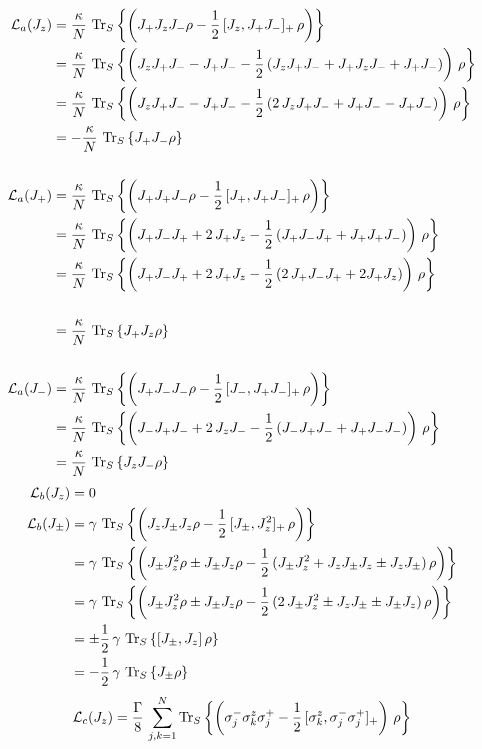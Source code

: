 \documentclass{article}
\begin{document}
\begin{appendices}
\begin{align*}
    \mathcal{L}_a(J_z)&=\frac{\kappa}{N}\,\operatorname{Tr}_S\left\{\left(J_+ J_z J_- \rho-\frac{1}{2}\,[J_z,J_+ J_-]_+\,\rho\right)\right\}\\
    &=\frac{\kappa}{N}\,\operatorname{Tr}_S\left\{\left(J_z J_+ J_- - J_+ J_- -\frac{1}{2}\,(J_z J_+ J_- + J_+ J_z J_- + J_+ J_-)\right)\,\rho\right\}\\
    &=\frac{\kappa}{N}\,\operatorname{Tr}_S\left\{\left(J_z J_+ J_- - J_+ J_- -\frac{1}{2}\,(2\,J_z J_+ J_- + J_+ J_- - J_+ J_-)\right)\,\rho\right\}\\
    &=-\frac{\kappa}{N}\,\operatorname{Tr}_S\left\{J_+ J_- \rho\right\}\\\\
    \mathcal{L}_a(J_+)&=\frac{\kappa}{N}\,\operatorname{Tr}_S\left\{\left(J_+ J_+ J_- \rho-\frac{1}{2}\,[J_+,J_+ J_-]_+\,\rho\right)\right\}\\
    &=\frac{\kappa}{N}\,\operatorname{Tr}_S\left\{\left(J_+ J_- J_+ + 2\,J_+ J_z -\frac{1}{2}\,(J_+ J_- J_+ + J_+ J_+ J_-)\right)\,\rho\right\}\\ &=\frac{\kappa}{N}\,\operatorname{Tr}_S\left\{\left(J_+ J_- J_+ + 2\,J_+ J_z -\frac{1}{2}\,(2\,J_+ J_- J_+ + 2 J_+ J_z)\right)\,\rho\right\}\\\\
    &=\frac{\kappa}{N}\,\operatorname{Tr}_S\left\{J_+ J_z \rho\right\}\\\\
    \mathcal{L}_a(J_-)&=\frac{\kappa}{N}\,\operatorname{Tr}_S\left\{\left(J_+ J_- J_- \rho-\frac{1}{2}\,[J_-,J_+ J_-]_+\,\rho\right)\right\}\\
    &=\frac{\kappa}{N}\,\operatorname{Tr}_S\left\{\left(J_- J_+ J_- + 2\,J_z J_- -\frac{1}{2}\,(J_- J_+ J_- + J_+ J_- J_-)\right)\,\rho\right\}\\ 
    &=\frac{\kappa}{N}\,\operatorname{Tr}_S\left\{J_z J_- \rho\right\}
\end{align*}
\begin{align*}
    \mathcal{L}_b(J_z)&=0\\
    \mathcal{L}_b(J_\pm)&=\gamma\,\operatorname{Tr}_S\left\{\left(J_z J_\pm J_z \rho-\frac{1}{2}\,[J_\pm,J_z^2]_+\,\rho\right)\right\}\\
    &=\gamma\,\operatorname{Tr}_S\left\{\left(J_\pm J_z^2\rho \pm J_\pm J_z \rho-\frac{1}{2}\,(J_\pm J_z^2 + J_z J_\pm J_z \pm J_z J_\pm)\,\rho\right)\right\}\\
    &=\gamma\,\operatorname{Tr}_S\left\{\left(J_\pm J_z^2\rho \pm J_\pm J_z \rho-\frac{1}{2}\,(2\,J_\pm J_z^2  \pm J_z J_\pm \pm J_\pm J_z)\,\rho\right)\right\}\\
    &=\pm\frac{1}{2}\, \gamma\,\operatorname{Tr}_S\left\{[J_\pm,J_z]\,\rho\right\}\\
    &=-\frac{1}{2}\,\gamma\,\operatorname{Tr}_S\left\{J_\pm\rho\right\}
\end{align*}
\begin{align*}
    \mathcal{L}_c(J_z)&=\frac{\Gamma}{8}\,\sum_{j,k=1}^N \Trs{\left( \sigma_j^- \sigma_k^z \sigma_j^+ -\half\,[\sigma_k^z,\sigma_j^-\sigma_j^+]_+   \right)\,\rho}\\

\end{align*}
\end{appendices}
\end{document}
